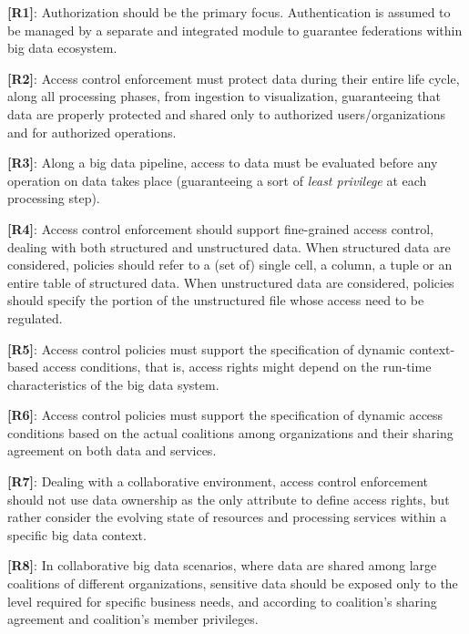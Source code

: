 \noindent \textbf{[R1]}: Authorization should be the primary focus. Authentication is assumed to be managed by a separate and integrated module to guarantee federations within big data ecosystem. 
 
\noindent \textbf{[R2]}: Access control enforcement must protect data during their entire life cycle, along all processing phases, from ingestion to visualization, guaranteeing that data are properly protected and shared only to authorized users/organizations and for authorized operations. 

\noindent  \textbf{[R3]}: Along a big data pipeline, access to data must be evaluated before any operation on data takes place (guaranteeing a sort of \emph{least privilege} at each processing step).

\noindent \textbf{[R4]}: Access control enforcement should support fine-grained access control, dealing with both structured and unstructured data. When structured data are considered, policies should refer to a (set of) single cell, a column, a tuple or an entire table of structured data. When unstructured data are considered, policies should specify the portion of the unstructured file whose access need to be regulated. 

\noindent  \textbf{[R5]}: Access control policies must support the specification of dynamic context-based access conditions, that is, access rights might depend on the run-time characteristics of the big data system.

\noindent  \textbf{[R6]}: Access control policies must support the specification of dynamic access conditions based on the actual coalitions among organizations and their sharing agreement on both data and services.

\noindent  \textbf{[R7]}: Dealing with a collaborative environment, access control enforcement should not use data ownership as the only attribute to define access rights, but rather consider the evolving state of resources and processing services within a specific big data context. 

\noindent  \textbf{[R8]}: In collaborative big data scenarios, where data are shared among large coalitions of different organizations, sensitive data should be exposed only to the level required for specific business needs, and according to coalition's sharing agreement and coalition's member privileges.

